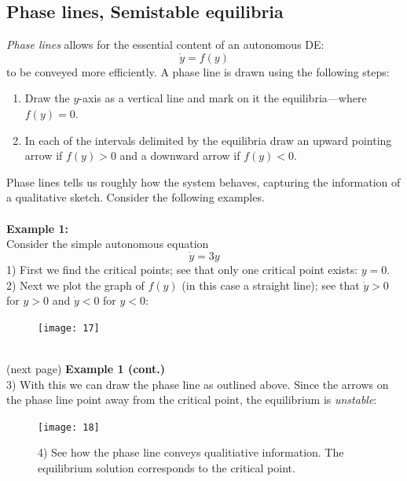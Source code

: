 \documentclass{report}
\begin{document}
\subsection{Phase lines, Semistable equilibria}
\textit{Phase lines} allows for the essential content of an autonomous DE:
\begin{equation*}
\dot{y}=f(y)
\end{equation*}
to be conveyed more efficiently. A phase line is drawn using the following steps:
\begin{enumerate}
\item Draw the $y$-axis as a vertical line and mark on it the equilibria---where $f(y)=0$.
\item In each of the intervals delimited by the equilibria draw an upward pointing arrow if $f(y)>0$ and a downward arrow if $f(y)<0$.
\end{enumerate}
Phase lines tells us roughly how the system behaves, capturing the information of a qualitative sketch. Consider 
the following examples.\\
\vspace{1mm}\\
\textbf{Example 1:}\\
Consider the simple autonomous equation
\begin{equation*}
\dot{y}=3y
\end{equation*}
1) First we find the critical points; see that only one critical point exists: $y=0$. 
2) Next we plot the graph of $f(y)$ (in this case a straight line); see that $\dot{y}>0$ for $y>0$ and $\dot{y}<0$ for $y<0$:
\begin{figure}[h]
\begin{center}
\texttt{[image: 17]}\\
\end{center}
\end{figure}\\
(next page)
\newpage
\noindent\textbf{Example 1 (cont.)}\\
3) With this we can draw the phase line as outlined above. Since the arrows on the phase line point
away from the critical point, the equilibrium is \textit{unstable}:
\begin{figure}[h]
\begin{center}
\texttt{[image: 18]}\\
\end{center}
4) See how the phase line conveys qualitiative information. The equilibrium solution corresponds to the critical
point.
\end{figure}\\
\end{document}

